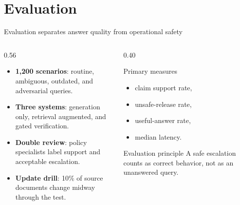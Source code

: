 \section{Evaluation}

\begin{frame}{Evaluation separates answer quality from operational safety}
  \begin{columns}[T,onlytextwidth]
    \begin{column}{0.56\textwidth}
      \begin{itemize}
        \item \textbf{1,200 scenarios}: routine, ambiguous, outdated, and adversarial queries.
        \item \textbf{Three systems}: generation only, retrieval augmented, and gated verification.
        \item \textbf{Double review}: policy specialists label support and acceptable escalation.
        \item \textbf{Update drill}: 10\% of source documents change midway through the test.
      \end{itemize}
    \end{column}
    \begin{column}{0.40\textwidth}
      \begin{block}{Primary measures}
        \begin{itemize}
          \item claim support rate,
          \item unsafe-release rate,
          \item useful-answer rate,
          \item median latency.
        \end{itemize}
      \end{block}
      \begin{exampleblock}{Evaluation principle}
        A safe escalation counts as correct behavior, not as an unanswered query.
      \end{exampleblock}
    \end{column}
  \end{columns}
\end{frame}

